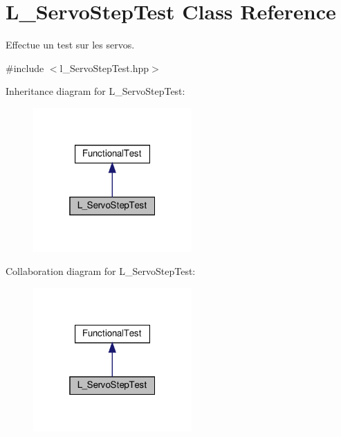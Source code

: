 \hypertarget{classL__ServoStepTest}{}\section{L\+\_\+\+Servo\+Step\+Test Class Reference}
\label{classL__ServoStepTest}


Effectue un test sur les servos.  




{\ttfamily \#include $<$l\+\_\+\+Servo\+Step\+Test.\+hpp$>$}



Inheritance diagram for L\+\_\+\+Servo\+Step\+Test\+:
\nopagebreak
\begin{figure}[H]
\begin{center}
\leavevmode
\includegraphics[width=172pt]{classL__ServoStepTest__inherit__graph}
\end{center}
\end{figure}


Collaboration diagram for L\+\_\+\+Servo\+Step\+Test\+:
\nopagebreak
\begin{figure}[H]
\begin{center}
\leavevmode
\includegraphics[width=172pt]{classL__ServoStepTest__coll__graph}
\end{center}
\end{figure}

